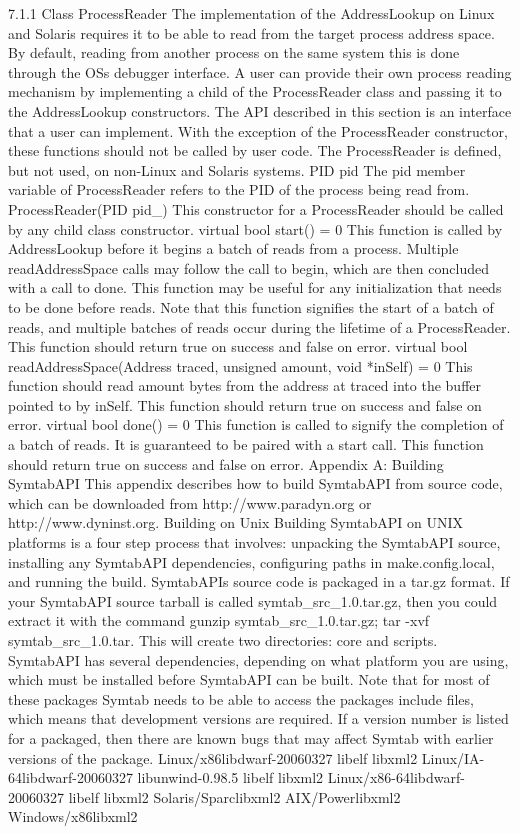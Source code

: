 7.1.1 Class ProcessReader
The implementation of the AddressLookup on Linux and Solaris requires it to be able to read from the target process address space. By default, reading from another process on the same system this is done through the OSs debugger interface. A user can provide their own process reading mechanism by implementing a child of the ProcessReader class and passing it to the AddressLookup constructors. 
The API described in this section is an interface that a user can implement. With the exception of the ProcessReader constructor, these functions should not be called by user code.
The ProcessReader is defined, but not used, on non-Linux and Solaris systems.
PID pid
The pid member variable of ProcessReader refers to the PID of the process being read from.
ProcessReader(PID pid_)
This constructor for a ProcessReader should be called by any child class constructor.
virtual bool start() = 0
This function is called by AddressLookup before it begins a batch of reads from a process. Multiple readAddressSpace calls may follow the call to begin, which are then concluded with a call to done. This function may be useful for any initialization that needs to be done before reads. Note that this function signifies the start of a batch of reads, and multiple batches of reads occur during the lifetime of a ProcessReader. 
This function should return true on success and false on error.
virtual bool readAddressSpace(Address traced, unsigned amount, void *inSelf) = 0
This function should read amount bytes from the address at traced into the buffer pointed to by inSelf. 
This function should return true on success and false on error.
virtual bool done() = 0
This function is called to signify the completion of a batch of reads. It is guaranteed to be paired with a start call.
This function should return true on success and false on error.
Appendix A: Building SymtabAPI
This appendix describes how to build SymtabAPI from source code, which can be downloaded from http://www.paradyn.org or http://www.dyninst.org. 
 Building on Unix
Building SymtabAPI on UNIX platforms is a four step process that involves: unpacking the SymtabAPI source, installing any SymtabAPI dependencies, configuring paths in make.config.local, and running the build. 
SymtabAPIs source code is packaged in a tar.gz format. If your SymtabAPI source tarball is called symtab_src_1.0.tar.gz, then you could extract it with the command gunzip symtab_src_1.0.tar.gz; tar -xvf symtab_src_1.0.tar. This will create two directories: core and scripts. 
SymtabAPI has several dependencies, depending on what platform you are using, which must be installed before SymtabAPI can be built. Note that for most of these packages Symtab needs to be able to access the packages include files, which means that development versions are required. If a version number is listed for a packaged, then there are known bugs that may affect Symtab with earlier versions of the package. 
Linux/x86libdwarf-20060327 
libelf
libxml2
Linux/IA-64libdwarf-20060327 
libunwind-0.98.5
libelf
libxml2
Linux/x86-64libdwarf-20060327 
libelf
libxml2
Solaris/Sparclibxml2
AIX/Powerlibxml2
Windows/x86libxml2

